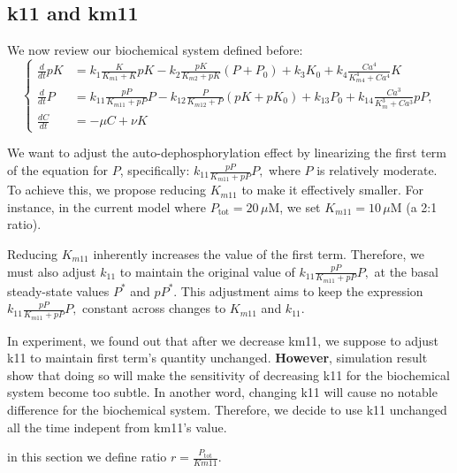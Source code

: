 \documentclass{article}
\begin{document}
\subsection{k11 and km11}
We now review our biochemical system defined before:
\begin{equation}
\left\{
    \begin{aligned}
        \frac{d}{dt}pK &= k_1 \frac{K}{K_{m1} + K}pK - k_2 \frac{pK}{K_{m2} + pK}(P + P_0) + k_3K_0 + k_4 \frac{Ca^4}{K_{m4}^4 + Ca^4} K\\
        \frac{d}{dt}P &= k_{11} \frac{pP}{K_{m11} + pP}P - k_{12} \frac{P}{K_{m12} + P}(pK + pK_0) + k_{13}P_0 + k_{14} \frac{Ca^3}{K_{m}^3 + Ca^3}pP,\\
        \frac{dC}{dt} &=-\mu C+\nu K
    \end{aligned}
\right.
\end{equation}

We want to adjust the auto-dephosphorylation effect by linearizing the first term of the equation for \( P \), specifically:
\(
k_{11} \frac{pP}{K_{m11} + pP} P,
\)
where \( P \) is relatively moderate. To achieve this, we propose reducing \( K_{m11} \) to make it effectively smaller. For instance, in the current model where \( P_{\text{tot}} = 20 \, \mu \text{M} \), we set \( K_{m11} = 10 \, \mu \text{M} \) (a 2:1 ratio).

Reducing \( K_{m11} \) inherently increases the value of the first term. Therefore, we must also adjust \( k_{11} \) to maintain the original value of 
\(
k_{11} \frac{pP}{K_{m11} + pP} P,
\)
at the basal steady-state values \( P^* \) and \( pP^* \). This adjustment aims to keep the expression
\(
k_{11} \frac{pP}{K_{m11} + pP} P,
\)
constant across changes to \( K_{m11} \) and \( k_{11} \).


In experiment, we found out that after we decrease km11, we suppose to adjust k11 to maintain first term's quantity unchanged. \textbf{However}, simulation result show that doing so will make the sensitivity of decreasing k11 for the biochemical system become too subtle. In another word, changing k11 will cause no notable difference for the biochemical system. Therefore, we decide to use k11 unchanged all the time indepent from km11's value.

in this section we define ratio $r=\frac{P_{\text{tot}}}{Km11}$.
\end{document}
